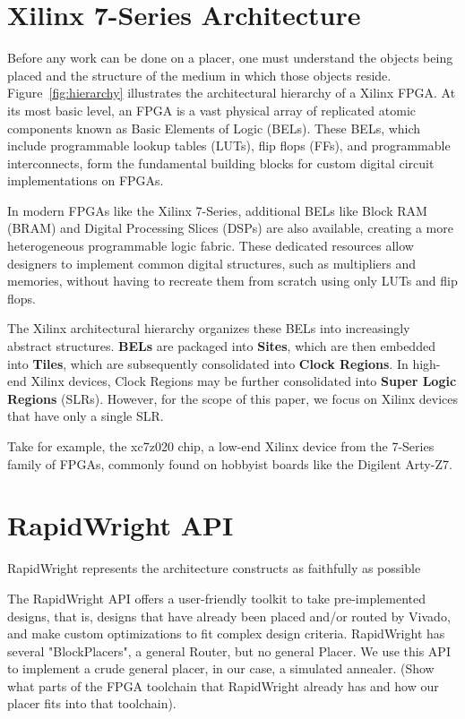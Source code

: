 \documentclass{article}
\begin{document}
\begin{multicols}{2}
\section{Xilinx 7-Series Architecture}
    Before any work can be done on a placer, one must understand the objects being placed and the structure of the medium in which those objects reside. 
    Figure~\ref{fig:hierarchy} illustrates the architectural hierarchy of a Xilinx FPGA. 
    At its most basic level, an FPGA is a vast physical array of replicated atomic components known as Basic Elements of Logic (BELs).
    These BELs, which include programmable lookup tables (LUTs), flip flops (FFs), and programmable interconnects, form the fundamental building blocks for custom digital circuit implementations on FPGAs.

    In modern FPGAs like the Xilinx 7-Series, additional BELs like Block RAM (BRAM) and Digital Processing Slices (DSPs) are also available, creating a more heterogeneous programmable logic fabric. 
    These dedicated resources allow designers to implement common digital structures, such as multipliers and memories, without having to recreate them from scratch using only LUTs and flip flops.

    The Xilinx architectural hierarchy organizes these BELs into increasingly abstract structures. 
    \textbf{BELs} are packaged into \textbf{Sites}, which are then embedded into \textbf{Tiles}, which are subsequently consolidated into \textbf{Clock Regions}. 
    In high-end Xilinx devices, Clock Regions may be further consolidated into \textbf{Super Logic Regions} (SLRs). 
    However, for the scope of this paper, we focus on Xilinx devices that have only a single SLR.

    Take for example, the xc7z020 chip, a low-end Xilinx device from the 7-Series family of FPGAs, commonly found on hobbyist boards like the Digilent Arty-Z7.


\section{RapidWright API}
    RapidWright represents the architecture constructs as faithfully as possible

    The RapidWright API offers a user-friendly toolkit to take pre-implemented designs, that is, designs that have already been placed and/or routed by Vivado, and make custom optimizations to fit complex design criteria. 
    RapidWright has several "BlockPlacers", a general Router, but no general Placer. 
    We use this API to implement a crude general placer, in our case, a simulated annealer. 
    (Show what parts of the FPGA toolchain that RapidWright already has and how our placer fits into that toolchain). 

\end{multicols}
\end{document}
